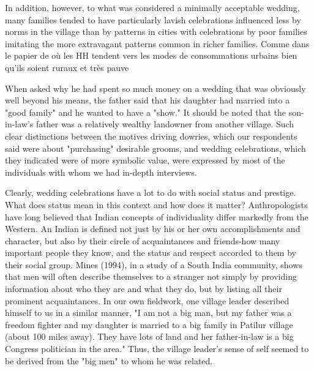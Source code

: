 \documentclass[a4paper, 11pt, onecolumn]{article}
\begin{document}
In addition, however, to what was considered a minimally acceptable wedding,
many families tended to have particularly lavish celebrations influenced less by norms
in the village than by patterns in cities with celebrations by poor families imitating the
more extravagant patterns common in richer families. 
Comme dans le papier de \cite{Guerin2014a} où les HH tendent vers les modes de consommations urbains bien qu'ils soient ruraux et très pauve

When asked why he
had spent so much money on a wedding that was obviously well beyond his means, the
father said that his daughter had married into a "good family" and he wanted to have a
"show." It should be noted that the son-in-law's father was a relatively wealthy
landowner from another village. Such clear distinctions between the motives driving
dowries, which our respondents said were about "purchasing" desirable grooms, and
wedding celebrations, which they indicated were of more symbolic value, were
expressed by most of the individuals with whom we had in-depth interviews.

Clearly, wedding celebrations have a lot to do with social status and prestige. What
does status mean in this context and how does it matter? Anthropologists have long
believed that Indian concepts of individuality differ markedly from the Western. An
Indian is defined not just by his or her own accomplishments and character, but also
by their circle of acquaintances and friends-how many important people they know,
and the status and respect accorded to them by their social group. Mines (1994), in a
study of a South India community, shows that men will often describe themselves to
a stranger not simply by providing information about who they are and what they do,
but by listing all their prominent acquaintances. In our own fieldwork, one village
leader described himself to us in a similar manner, "I am not a big man, but my father
was a freedom fighter and my daughter is married to a big family in Patilur village
(about 100 miles away). They have lots of land and her father-in-law is a big Congress
politician in the area." Thus, the village leader's sense of self seemed to be derived
from the "big men" to whom he was related.
\end{document}
